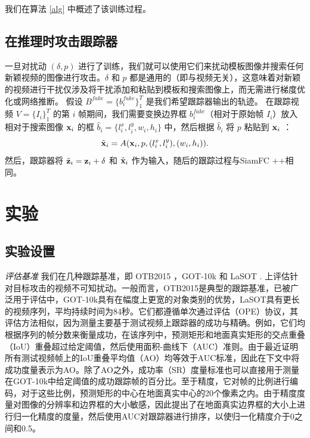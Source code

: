 我们在算法 \ref{alg} 中概述了该训练过程。

\subsection{在推理时攻击跟踪器}

一旦对扰动 $(\delta, p)$ 进行了训练，我们就可以使用它们来扰动模板图像并搜索任何新颖视频的图像进行攻击。$\delta$ 和 $p$ 都是通用的（即与视频无关），这意味着对新颖的视频进行干扰仅涉及将干扰添加和粘贴到模板和搜索图像上，而无需进行梯度优化或网络推断。
假设 $B^{fake}=\{b^{fake}_i\}_1^{T}$ 是我们希望跟踪器输出的轨迹。
在跟踪视频 $V=\{I_i\}_1^T$ 的第 $i$ 帧期间，我们需要变换边界框 $b^{fake}_i$（相对于原始帧 $I_i$）放入相对于搜索图像 $\textbf x_i$ 的框 $\hat b_i=\{l^x_i, l^y_i, w_i, h_i\}$ 中，然后根据 $\hat b_i$ 将 $p$ 粘贴到 $\textbf x_i$ ：
\begin{equation}
\tilde{\textbf x}_i = A(\textbf x_i, p, (l^x_i, l^y_i), (w_i, h_i)).
\end{equation}
然后，跟踪器将 $\tilde{\textbf z}_i=\textbf z_i+\delta$ 和 $\tilde{ \textbf x}_i$ 作为输入，随后的跟踪过程与SiamFC ++相同。

\section{实验}

\subsection{实验设置}

\textit{评估基准} 我们在几种跟踪基准，即 OTB2015 \cite{OTB}，GOT-10k \cite{GOT-10k} 和 LaSOT \cite{LaSOT}. 上评估针对目标攻击的视频不可知扰动。一般而言，OTB2015是典型的跟踪基准，已被广泛用于评估中，GOT-10k具有在幅度上更宽的对象类别的优势，LaSOT具有更长的视频序列，平均持续时间为84秒。它们都遵循单次通过评估（OPE）协议，其评估方法相似，因为测量主要基于测试视频上跟踪器的成功与精确。例如，它们均根据序列的帧分数来衡量成功，在该序列中，预测矩形和地面真实矩形的交点重叠（IoU）重叠超过给定阈值，然后使用面积-曲线下（AUC）准则。由于最近证明所有测试视频帧上的IoU重叠平均值（AO）均等效于AUC标准，因此在下文中将成功度量表示为AO。除了AO之外，成功率（SR）度量标准也可以直接用于测量在GOT-10k中给定阈值的成功跟踪帧的百分比。至于精度，它对帧的比例进行编码，对于这些比例，预测矩形的中心在地面真实中心的20个像素之内。由于精度度量对图像的分辨率和边界框的大小敏感，因此提出了在地面真实边界框的大小上进行归一化精度的度量，然后使用AUC对跟踪器进行排序，以使归一化精度介于0之间和0.5。

